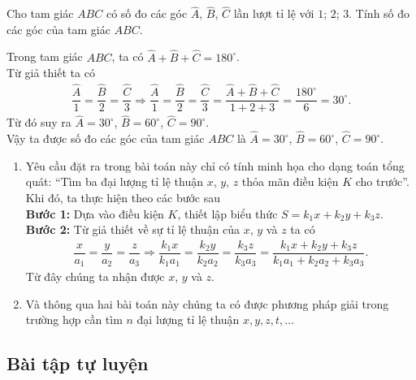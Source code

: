\begin{vd}%
 Cho tam giác $ABC$ có số đo các góc $\widehat{A}$, $\widehat{B}$, $\widehat{C}$ lần lượt tỉ lệ với $1$; $2$; $3$. Tính số đo các góc của tam giác $ABC$.
 \loigiai
  {
  Trong tam giác $ABC$, ta có $\widehat{A}+\widehat{B}+\widehat{C}=180^\circ$.\\
  Từ giả thiết ta có
  \begin{eqnarray*}
   \dfrac{\widehat{A}}{1} = \dfrac{\widehat{B}}{2} = \dfrac{\widehat{C}}{3} \Rightarrow \dfrac{\widehat{A}}{1} = \dfrac{\widehat{B}}{2} = \dfrac{\widehat{C}}{3} = \dfrac{\widehat{A}+\widehat{B}+\widehat{C}}{1+2+3} = \dfrac{180^\circ}{6} = 30^\circ.
  \end{eqnarray*}
  Từ đó suy ra $\widehat{A}=30^\circ$, $\widehat{B}=60^\circ$, $\widehat{C}=90^\circ$.\\
  Vậy ta được số đo các góc của tam giác $ABC$ là $\widehat{A}=30^\circ$, $\widehat{B}=60^\circ$, $\widehat{C}=90^\circ$.
  \begin{note}\textrm{}
   \begin{enumerate}
   	\item Yêu cầu đặt ra trong bài toán này chỉ có tính minh họa cho dạng toán tổng quát: ``Tìm ba đại lượng tỉ lệ thuận $x$, $y$, $z$ thỏa mãn điều kiện $K$ cho trước''.\\
   	Khi đó, ta thực hiện theo các bước sau\\
   	{\bf Bước 1:} Dựa vào điều kiện $K$, thiết lập biểu thức $S=k_1x+k_2y+k_3z$.\\
   	{\bf Bước 2:} Từ giả thiết về sự tỉ lệ thuận của $x$, $y$ và $z$ ta có
   	\begin{eqnarray*}
   	 \dfrac{x}{a_1}=\dfrac{y}{a_2}=\dfrac{z}{a_3} \Rightarrow \dfrac{k_1x}{k_1a_1}=\dfrac{k_2y}{k_2a_2}=\dfrac{k_3z}{k_3a_3} = \dfrac{k_1x+k_2y+k_3z}{k_1a_1+k_2a_2+k_3a_3}.
   	\end{eqnarray*}
   	Từ đây chúng ta nhận được $x$, $y$ và $z$.
   	\item Và thông qua hai bài toán này chúng ta có được phương pháp giải trong trường hợp cần tìm $n$ đại lượng tỉ lệ thuận $x, y, z, t,\ldots$
   \end{enumerate}
  \end{note}
  }
\end{vd}


\subsection{Bài tập tự luyện}


